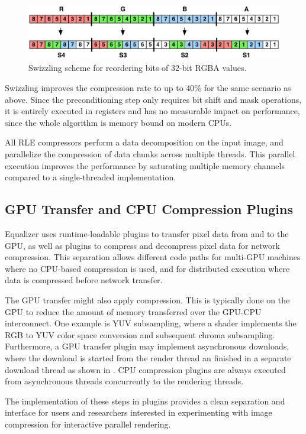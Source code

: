 \begin{figure}[h!t]
  \centering
  \includegraphics[width=\textwidth]{images/swizzle}
  \caption{Swizzling scheme for reordering bits of 32-bit RGBA values.}
  \label{fSwizzle}
\end{figure}

Swizzling improves the compression rate to up to 40\% for the same scenario as
above. Since the preconditioning step only requires bit shift and mask
operations, it is entirely executed in registers and has no measurable
impact on performance, since the whole algorithm is memory bound on modern CPUs.

All RLE compressors perform a data decomposition on the input image, and
parallelize the compression of data chunks across multiple threads. This
parallel execution improves the performance by saturating multiple memory
channels compared to a single-threaded implementation.

\subsection{GPU Transfer and CPU Compression Plugins}

Equalizer uses runtime-loadable plugins to transfer pixel data from and to the
GPU, as well as plugins to compress and decompress pixel data for network
compression. This separation allows different code paths for multi-GPU machines
where no CPU-based compression is used, and for distributed execution where data
is compressed before network transfer.

The GPU transfer might also apply compression. This is typically done on the
GPU to reduce the amount of memory transferred over the GPU-CPU interconnect.
One example is YUV subsampling, where a shader implements the RGB to YUV color
space conversion and subsequent chroma subsampling. Furthermore, a GPU transfer
plugin may implement asynchronous downloads, where the download is started
from the render thread an finished in a separate download thread as shown in
. CPU compression plugins are always executed from asynchronous
threads concurrently to the rendering threads.

The implementation of these steps in plugins provides a clean separation and
interface for users and researchers interested in experimenting with image
compression for interactive parallel rendering.


